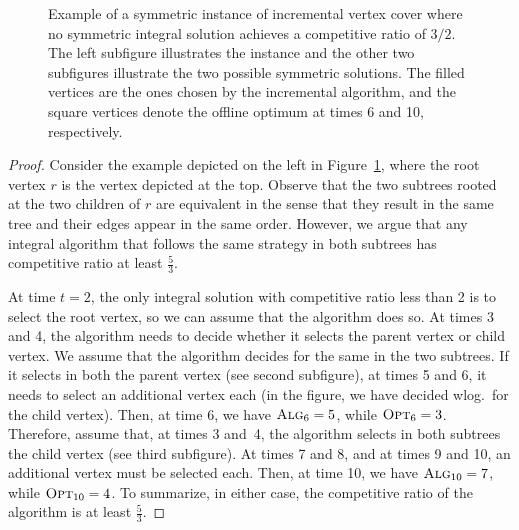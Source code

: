 \documentclass[a4paper,USenglish,cleveref,autoref,thm-restate,pdfa]{lipics-v2021}
\newcommand{\alg}{\textsc{Alg}\xspace}
\newcommand{\opt}{\textsc{Opt}\xspace}
\begin{document}
\begin{figure}
\begin{center}
\end{center}
\caption{Example of a symmetric instance of incremental vertex cover where no symmetric integral solution achieves a competitive ratio of $3/2$.
The left subfigure illustrates the instance and the other two subfigures illustrate the two possible symmetric solutions. The filled vertices are the ones chosen by the incremental algorithm, and the square vertices denote the offline optimum at times 6 and 10, respectively.}
\label{fig:integral_example}
\end{figure}

\begin{proof}
Consider the example depicted on the left in Figure~\ref{fig:integral_example}, where the root vertex $r$ is the vertex depicted at the top.
Observe that the two subtrees rooted at the two children of $r$ are equivalent in the sense that they result in the same tree and their edges appear in the same order.
However, we argue that any integral algorithm that follows the same strategy in both subtrees has competitive ratio at least $\frac53$.

At time $t=2$, the only integral solution with competitive ratio less than 2 is to select the root vertex, so we can assume that the algorithm does so.
At times 3 and 4, the algorithm needs to decide whether it selects the parent vertex or child vertex. We assume that the algorithm decides for the same in the two subtrees.
If it selects in both the parent vertex (see second subfigure), at times 5 and 6, it needs to select an additional vertex each (in the figure, we have decided wlog.~for the child vertex). Then, at time 6, we have $\alg_6=5$, while $\opt_6=3$.
Therefore, assume that, at times 3 and~4, the algorithm selects in both subtrees the child vertex (see third subfigure). At times 7 and 8, and at times 9 and 10, an additional vertex must be selected each. 
Then, at time 10, we have $\alg_{10}=7$, while $\opt_{10}=4$.
To summarize, in either case, the competitive ratio of the algorithm is at least $\frac53$.
\end{proof}
\end{document}
